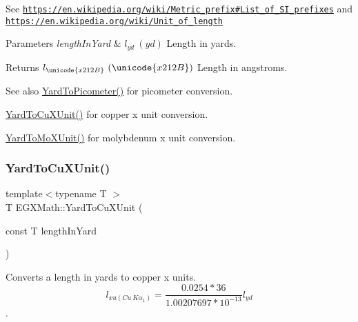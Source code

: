 See \href{https://en.wikipedia.org/wiki/Metric_prefix#List_of_SI_prefixes}{\tt https\+://en.\+wikipedia.\+org/wiki/\+Metric\+\_\+prefix\#\+List\+\_\+of\+\_\+\+S\+I\+\_\+prefixes} and \href{https://en.wikipedia.org/wiki/Unit_of_length}{\tt https\+://en.\+wikipedia.\+org/wiki/\+Unit\+\_\+of\+\_\+length} 
\begin{DoxyParams}{Parameters}
{\em length\+In\+Yard} & $ l_{yd}\ (yd)$ Length in yards. \\
\hline
\end{DoxyParams}
\begin{DoxyReturn}{Returns}
$ l_{\unicode{x212B}}\ (\unicode{x212B})$ Length in angstroms. 
\end{DoxyReturn}
\begin{DoxySeeAlso}{See also}
\mbox{\hyperlink{group___e_g_x_math-_conversions-_length_conversions-_imperial-_yard-_s_i_ga1d0bc498fe3ed1693555aa6917abb758}{Yard\+To\+Picometer()}} for picometer conversion. 

\mbox{\hyperlink{group___e_g_x_math-_conversions-_length_conversions-_imperial-_yard-_non-_s_i_gabf4916569d4002f5c0ec8bbef8207980}{Yard\+To\+Cu\+X\+Unit()}} for copper x unit conversion. 

\mbox{\hyperlink{group___e_g_x_math-_conversions-_length_conversions-_imperial-_yard-_non-_s_i_ga81f1fa776a2154865e8ee4be46ef693d}{Yard\+To\+Mo\+X\+Unit()}} for molybdenum x unit conversion. 
\end{DoxySeeAlso}
\mbox{\label{group___e_g_x_math-_conversions-_length_conversions-_imperial-_yard-_non-_s_i_gabf4916569d4002f5c0ec8bbef8207980}} 
\subsubsection{\texorpdfstring{Yard\+To\+Cu\+X\+Unit()}{YardToCuXUnit()}}
{\footnotesize\ttfamily template$<$typename T $>$ \\
T E\+G\+X\+Math\+::\+Yard\+To\+Cu\+X\+Unit (\begin{DoxyParamCaption}\item[{const T}]{length\+In\+Yard }\end{DoxyParamCaption})}



Converts a length in yards to copper x units. \[ l_{xu(Cu\ K\alpha_1)}=\frac{0.0254 * 36}{1.00207697*10^{-13}} l_{yd}\]. 


